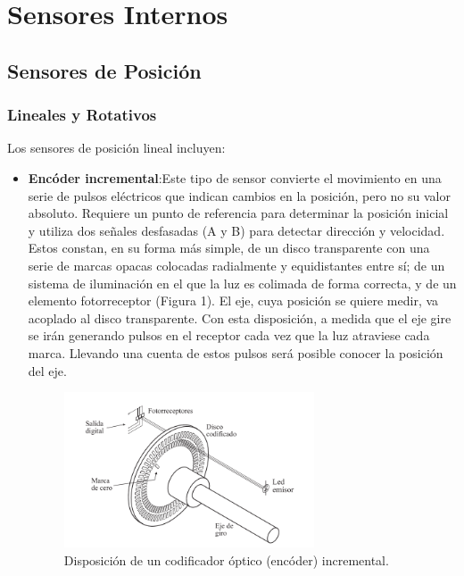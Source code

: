 \section{\textbf{Sensores Internos}}
	\subsection{\textbf{Sensores de Posición}}
\subsubsection{\textbf{Lineales y Rotativos}}
Los sensores de posición lineal incluyen:

\begin{itemize}
	\item \textbf{Encóder incremental}:Este tipo de sensor convierte el movimiento en una serie de pulsos eléctricos que indican cambios en la posición, pero no su valor absoluto. Requiere un punto de referencia para determinar la posición inicial y utiliza dos señales desfasadas (A y B) para detectar dirección y velocidad. Estos constan, en su forma más simple, de un
	disco transparente con una serie de marcas opacas colocadas radialmente y equidistantes entre sí; de un sistema de iluminación en el que la luz es colimada de forma correcta, y de un elemento fotorreceptor (Figura 1). El eje, cuya posición se quiere medir, va acoplado al disco transparente. Con esta disposición, a medida que el eje gire se irán generando pulsos en el receptor cada vez que la luz atraviese cada marca. Llevando una cuenta de estos pulsos será posible conocer la posición del eje.
	\begin{figure}[H]
		\centering
		\includegraphics[width=0.7\textwidth]{img/encoderincremental.png}
		\caption{Disposición de un codificador óptico (encóder) incremental.}
		\label{fig:encoderincremental}
	\end{figure}
	

\end{itemize}

